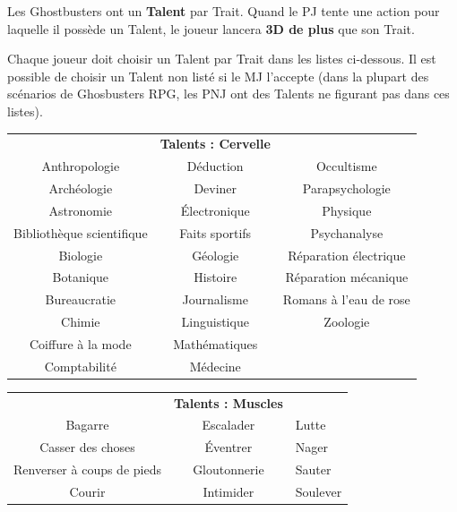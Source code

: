 \begin{frame}[b]
{\begin{minipage}[c][0.95\textheight][c]{\linewidth}

\myindent Les Ghostbusters ont un \textbf{Talent} par Trait. Quand le PJ tente une action pour laquelle il possède un Talent, le joueur lancera \textbf{3D de plus} que son Trait.

\myindent Chaque joueur doit choisir un Talent par Trait dans les listes ci-dessous. Il est possible de choisir un Talent non listé si le MJ l'accepte (dans la plupart des scénarios de Ghosbusters RPG, les PNJ ont des Talents ne figurant pas dans ces listes).
\end{minipage}
}{
\begin{minipage}[c][0.95\textheight][c]{\linewidth}
\begin{center}
\begin{tabular}{ccc}
&\textbf{Talents : Cervelle}&\\
Anthropologie & Déduction & Occultisme \\ 
Archéologie & Deviner & Parapsychologie \\
Astronomie & Électronique &  Physique \\ 
Bibliothèque scientifique & Faits sportifs & Psychanalyse \\ 
Biologie & Géologie & Réparation électrique \\
Botanique & Histoire & Réparation mécanique \\
Bureaucratie & Journalisme & Romans à l'eau de rose \\
Chimie & Linguistique & Zoologie \\
Coiffure à la mode & Mathématiques & \\
Comptabilité & Médecine & \\
\end{tabular}
\end{center}

\begin{center}
\begin{tabular}{cc>{\centering\arraybackslash}p{2.5cm}}
& \textbf{Talents : Muscles} &  \\
Bagarre & Escalader & Lutte \\
Casser des choses & Éventrer & Nager \\
Renverser à coups de pieds & Gloutonnerie & Sauter \\
Courir & Intimider & Soulever \\
\end{tabular}
\end{center}


\end{minipage}}
\end{frame}
